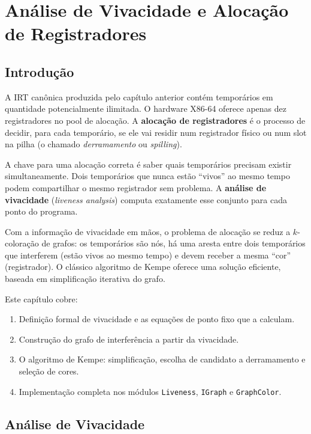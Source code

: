 \chapter{Análise de Vivacidade e Alocação de
Registradores}\label{chap:x86-alloc}

\section{Introdução}

A IRT canônica produzida pelo capítulo anterior contém temporários em
quantidade potencialmente ilimitada. O hardware X86-64 oferece apenas
dez registradores no pool de alocação. A \textbf{alocação de registradores}
é o processo de decidir, para cada temporário, se ele vai residir num
registrador físico ou num slot na pilha (o chamado \emph{derramamento} ou
\emph{spilling}).

A chave para uma alocação correta é saber quais temporários precisam
existir simultaneamente. Dois temporários que nunca estão ``vivos'' ao
mesmo tempo podem compartilhar o mesmo registrador sem problema. A
\textbf{análise de vivacidade} (\textit{liveness analysis}) computa
exatamente esse conjunto para cada ponto do programa.

Com a informação de vivacidade em mãos, o problema de alocação se
reduz a $k$-coloração de grafos: os temporários são nós, há uma aresta
entre dois temporários que interferem (estão vivos ao mesmo tempo) e
devem receber a mesma ``cor'' (registrador). O clássico algoritmo de
Kempe oferece uma solução eficiente, baseada em simplificação iterativa
do grafo.

Este capítulo cobre:

\begin{enumerate}
  \item Definição formal de vivacidade e as equações de ponto fixo que
    a calculam.
  \item Construção do grafo de interferência a partir da vivacidade.
  \item O algoritmo de Kempe: simplificação, escolha de candidato a
    derramamento e seleção de cores.
  \item Implementação completa nos módulos \texttt{Liveness},
    \texttt{IGraph} e \texttt{GraphColor}.
\end{enumerate}

\section{Análise de Vivacidade}

